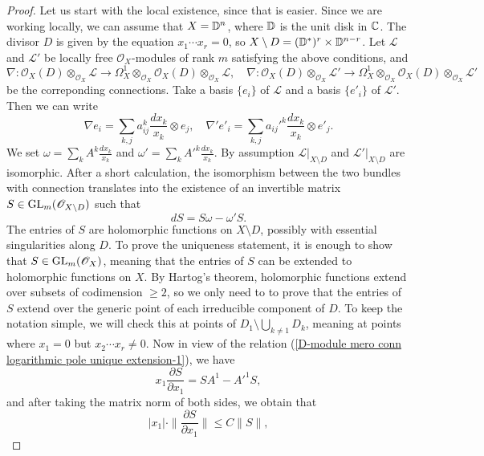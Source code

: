 \begin{proof}
Let us start with the local existence, since that is easier. Since we are working locally, we can assume that $X=\mathbb{D}^n$, where $\mathbb{D}$ is the unit disk in $\mathbb{C}$. The divisor $D$ is given by the equation $x_1\cdots x_r=0$, so $X\setminus D=(\mathbb{D}^*)^r\times\mathbb{D}^{n-r}$. Let $\mathscr{L}$ and $\mathscr{L}'$ be locally free $\mathscr{O}_X$-modules of rank $m$ satisfying the above conditions, and
\[\nabla:\mathscr{O}_X(D)\otimes_{\mathscr{O}_X}\mathscr{L}\to\Omega_X^1\otimes_{\mathscr{O}_X}\mathscr{O}_X(D)\otimes_{\mathscr{O}_X}\mathscr{L},\quad \nabla:\mathscr{O}_X(D)\otimes_{\mathscr{O}_X}\mathscr{L}'\to\Omega_X^1\otimes_{\mathscr{O}_X}\mathscr{O}_X(D)\otimes_{\mathscr{O}_X}\mathscr{L}'\]
be the correponding connections. Take a basis $\{e_i\}$ of $\mathscr{L}$ and a basis $\{e'_i\}$ of $\mathscr{L}'$. Then we can write
\[\nabla e_i=\sum_{k,j}a_{ij}^k\frac{dx_k}{x_k}\otimes e_j,\quad \nabla' e'_i=\sum_{k,j}a_{ij}'^k\frac{dx_k}{x_k}\otimes e'_j.\]
We set $\omega=\sum_kA^k\frac{dx_k}{x_k}$ and $\omega'=\sum_kA'^k\frac{dx_k}{x_k}$. By assumption $\mathscr{L}|_{X\setminus D}$ and $\mathscr{L}'|_{X\setminus D}$ are isomorphic. After a short calculation, the isomorphism between the two bundles with connection translates into the existence of an invertible matrix $S\in\mathrm{GL}_m(\mathscr{O}_{X\setminus D})$ such that
\begin{equation}\label{D-module mero conn logarithmic pole unique extension-1}
dS=S\omega-\omega'S.
\end{equation}
The entries of $S$ are holomorphic functions on $X\setminus D$, possibly with essential singularities along $D$. To prove the uniqueness statement, it is enough to show that $S\in\mathrm{GL}_m(\mathscr{O}_X)$, meaning that the entries of $S$ can be extended to holomorphic functions on $X$. By Hartog's theorem, holomorphic functions extend over subsets of codimension $\geq 2$, so we only need to to prove that the entries of $S$ extend over the generic point of each irreducible component of $D$. To keep the notation simple, we will check this at points of $D_1\setminus\bigcup_{k\neq 1}D_k$, meaning at points where $x_1=0$ but $x_2\cdots x_r\neq 0$. Now in view of the relation (\ref{D-module mero conn logarithmic pole unique extension-1}), we have
\begin{equation}\label{D-module mero conn logarithmic pole unique extension-2}
x_1\frac{\partial S}{\partial x_1}=SA^1-A'^1S,
\end{equation}
and after taking the matrix norm of both sides, we obtain that
\[|x_1|\cdot\|\frac{\partial S}{\partial x_1}\|\leq C\|S\|,\]

\end{proof}

